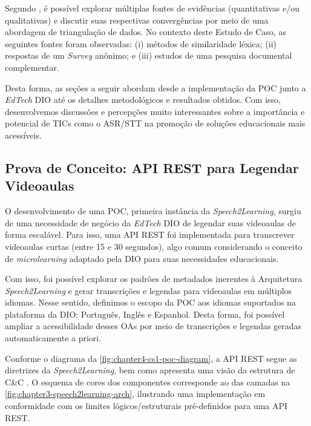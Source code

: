 Segundo \cite{Farquhar2020}, é possível explorar múltiplas fontes de evidências (quantitativas e/ou qualitativas) e discutir suas respectivas convergências por meio de uma abordagem de triangulação de dados. No contexto deste Estudo de Caso, as seguintes fontes foram observadas: (i) métodos de similaridade léxica; (ii) respostas de um \textit{Survey} anônimo; e (iii) estudos de uma pesquisa documental complementar.

Desta forma, as seções a seguir abordam desde a implementação da POC junto a \textit{EdTech} DIO até os detalhes metodológicos e resultados obtidos. Com isso, desenvolvemos discussões e percepções muito interessantes sobre a importância e potencial de TICs como o ASR/STT na promoção de soluções educacionais mais acessíveis.

\subsection{Prova de Conceito: API REST para Legendar Videoaulas}

O desenvolvimento de uma POC, primeira instância da \textit{Speech2Learning}, surgiu de uma necessidade de negócio da \textit{EdTech} DIO de legendar suas videoaulas de forma escalável. Para isso, uma API REST foi implementada para transcrever videoaulas curtas (entre 15 e 30 segundos), algo comum considerando o conceito de \textit{microlearning} adaptado pela DIO para suas necessidades educacionais. 

Com isso, foi possível explorar os padrões de metadados inerentes à Arquitetura \textit{Speech2Learning} e gerar transcrições e legendas para videoaulas em múltiplos idiomas. Nesse sentido, definimos o escopo da POC aos idiomas suportados na plataforma da DIO: Português, Inglês e Espanhol. Desta forma, foi possível ampliar a acessibilidade desses OAs por meio de transcrições e legendas geradas automaticamente a priori.

Conforme o diagrama da \autoref{fig:chapter4-cs1-poc-diagram}, a API REST segue as diretrizes da \textit{Speech2Learning}, bem como apresenta uma visão da estrutura de C\&C \cite{Bass2021}. O esquema de cores dos componentes corresponde ao das camadas na \autoref{fig:chapter3-speech2learning-arch}, ilustrando uma implementação em conformidade com os limites lógicos/estruturais pré-definidos para uma API REST.


